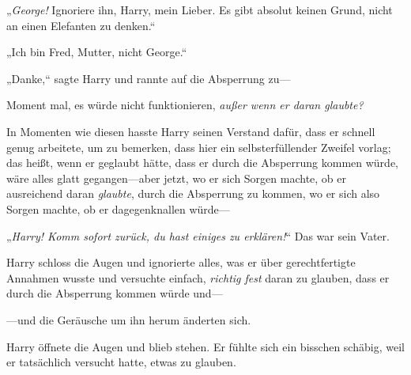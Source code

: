 „\emph{George!} Ignoriere ihn, Harry, mein Lieber. Es gibt absolut keinen Grund, nicht an einen Elefanten zu denken.“

„Ich bin Fred, Mutter, nicht George.“

„Danke,“ sagte Harry und rannte auf die Absperrung zu—

Moment mal, es würde nicht funktionieren, \emph{außer wenn er daran glaubte?}

In Momenten wie diesen hasste Harry seinen Verstand dafür, dass er schnell genug arbeitete, um zu bemerken, dass hier ein selbsterfüllender Zweifel vorlag; das heißt, wenn er geglaubt hätte, dass er durch die Absperrung kommen würde, wäre alles glatt gegangen—aber jetzt, wo er sich Sorgen machte, ob er ausreichend daran \emph{glaubte}, durch die Absperrung zu kommen, wo er sich also Sorgen machte, ob er dagegenknallen würde—

„\emph{Harry! Komm sofort zurück, du hast einiges zu erklären!}“ Das war sein Vater.

Harry schloss die Augen und ignorierte alles, was er über gerechtfertigte Annahmen wusste und versuchte einfach, \emph{richtig fest} daran zu glauben, dass er durch die Absperrung kommen würde und—

—und die Geräusche um ihn herum änderten sich.

Harry öffnete die Augen und blieb stehen. Er fühlte sich ein bisschen schäbig, weil er tatsächlich versucht hatte, etwas zu glauben.

